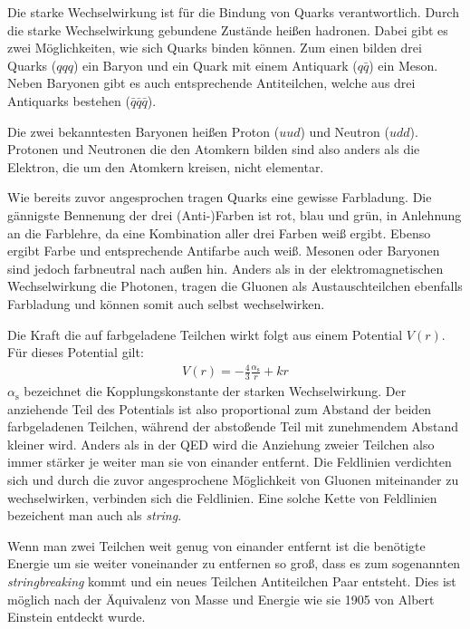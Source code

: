 Die starke Wechselwirkung ist für die Bindung von Quarks verantwortlich. Durch die starke Wechselwirkung gebundene Zust\"ande hei{\ss}en hadronen. Dabei gibt es zwei M\"oglichkeiten, wie sich Quarks binden k\"onnen. Zum einen bilden drei Quarks ($qqq$) ein Baryon und ein Quark mit einem Antiquark ($q\bar{q}$) ein Meson. Neben Baryonen gibt es auch entsprechende Antiteilchen, welche aus drei Antiquarks bestehen ($\bar{q}\bar{q}\bar{q}$).

Die zwei bekanntesten Baryonen hei{\ss}en Proton ($uud$) und Neutron ($udd$). Protonen und Neutronen die den Atomkern bilden sind also anders als die Elektron, die um den Atomkern kreisen, nicht elementar.

Wie bereits zuvor angesprochen tragen Quarks eine gewisse Farbladung. Die g\"annigste Bennenung der drei (Anti-)Farben ist rot, blau und gr\"un, in Anlehnung an die Farblehre, da eine Kombination aller drei Farben wei{\ss} ergibt. Ebenso ergibt Farbe und entsprechende Antifarbe auch wei{\ss}.
Mesonen oder Baryonen sind jedoch farbneutral nach au{\ss}en hin.
Anders als in der elektromagnetischen Wechselwirkung die Photonen, tragen die Gluonen als Austauschteilchen ebenfalls Farbladung und können somit auch selbst wechselwirken.

Die Kraft die auf farbgeladene Teilchen wirkt folgt aus einem Potential $V(r)$. F\"ur dieses Potential gilt:
\begin{align} \label{eq:Potential}
V(r) = -\frac{4}{3}\frac{\alpha_\text{s}}{r} + kr
\end{align}
$\alpha_\text{s}$ bezeichnet die Kopplungskonstante der starken Wechselwirkung. Der anziehende Teil des Potentials ist also proportional zum Abstand der beiden farbgeladenen Teilchen, w\"ahrend der absto{\ss}ende Teil mit zunehmendem Abstand kleiner wird. Anders als in der QED wird die Anziehung zweier Teilchen also immer stärker je weiter man sie von einander entfernt. Die Feldlinien verdichten sich und durch die zuvor angesprochene M\"oglichkeit von Gluonen miteinander zu wechselwirken, verbinden sich die Feldlinien. Eine solche Kette von Feldlinien bezeichent man auch als \textit{string}. 

Wenn man zwei Teilchen weit genug von einander entfernt ist die benötigte Energie um sie weiter voneinander zu entfernen so gro{\ss}, dass es zum sogenannten \textit{stringbreaking} kommt und ein neues Teilchen Antiteilchen Paar entsteht. Dies ist möglich nach der \"Aquivalenz von Masse und Energie wie sie 1905 von Albert Einstein entdeckt wurde.

